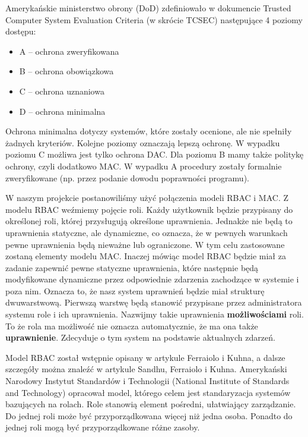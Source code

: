 \documentclass{classrep}
\begin{document}
Amerykańskie ministerstwo obrony (DoD) zdefiniowało w dokumencie Trusted Computer System Evaluation Criteria\cite{TCSEC} (w skrócie TCSEC) następujące 4 poziomy dostępu:
\begin{itemize}
\item A -- ochrona zweryfikowana
\item B -- ochrona obowiązkowa
\item C -- ochrona uznaniowa
\item D -- ochrona minimalna
\end{itemize}

Ochrona minimalna dotyczy systemów, które zostały ocenione, ale nie spełniły żadnych kryteriów. Kolejne poziomy oznaczają lepszą ochronę. W wypadku poziomu C możliwa jest
tylko ochrona DAC. Dla poziomu B mamy także politykę ochrony, czyli dodatkowo MAC. W wypadku A procedury zostały formalnie zweryfikowane (np. przez podanie dowodu poprawności programu).

W naszym projekcie postanowiliśmy użyć połączenia modeli RBAC i MAC. Z modelu RBAC weźmiemy pojęcie roli. Każdy użytkownik będzie przypisany do określonej roli, której przysługują
określone uprawnienia. Jednakże nie będą to uprawnienia statyczne, ale dynamiczne, co oznacza, że w pewnych warunkach pewne uprawnienia będą nieważne lub ograniczone.
W tym celu zastosowane zostaną elementy modelu MAC. Inaczej mówiąc model RBAC będzie miał za zadanie zapewnić pewne statyczne uprawnienia, które następnie będą modyfikowane dynamiczne
przez odpowiednie zdarzenia zachodzące w systemie i poza nim. Oznacza to, że nasz system uprawnień będzie miał strukturę dwuwarstwową. Pierwszą warstwę będą stanowić
przypisane przez administratora systemu role i ich uprawnienia. Nazwijmy takie uprawnienia \textbf{możliwościami} roli. To że rola ma możliwość nie oznacza automatycznie,
że ma ona także \textbf{uprawnienie}. Zdecyduje o tym system na podstawie aktualnych zdarzeń.

Model RBAC został wstępnie opisany w artykule Ferraiolo i Kuhna\cite{RBAC}, a dalsze szczegóły można znaleźć w artykule Sandhu, Ferraiolo i Kuhna\cite{NISTModel}.
Amerykański Narodowy Instytut Standardów i Technologii (National Institute of Standards and Technology) opracował model\cite{NIST}, którego celem jest standaryzacja systemów
bazujących na rolach. Role stanowią element pośredni, ułatwiający zarządzanie. Do jednej roli może być przyporządkowana więcej niż jedna osoba. Ponadto do jednej roli mogą być
przyporządkowane różne zasoby.
\end{document}

